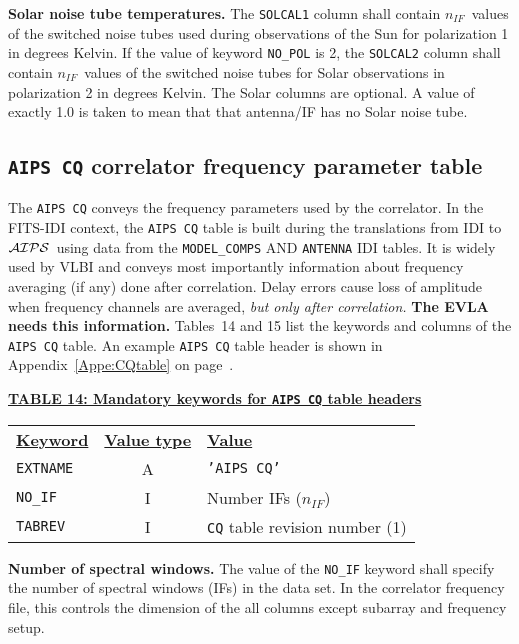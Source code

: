 \documentclass[twoside]{article}
\newcommand{\Hi}[1]{\textcolor{hicol}{#1}}
\newcommand{\AIPS}{{$\cal AIPS\/$}}
\newcommand{\nif}{$n_{IF}$}
\begin{document}
\Hi{{\bf Solar noise tube temperatures.} The {\tt SOLCAL1} column
shall contain \nif\ values of the switched noise tubes used during
observations of the Sun for polarization 1 in degrees Kelvin.  If the
value of keyword {\tt NO\_POL} is 2, the {\tt SOLCAL2} column shall
contain \nif\ values of the switched noise tubes for Solar
observations in polarization 2 in degrees Kelvin.  The Solar columns
are optional.  A value of exactly 1.0 is taken to mean that that
antenna/IF has no Solar noise tube.}

\subsection{{\tt AIPS CQ} correlator frequency parameter table}
\label{s:CQ}

The {\tt AIPS CQ} conveys the frequency parameters used by the
correlator.  In the FITS-IDI context, the {\tt AIPS CQ} table
is built during the translations from IDI to \AIPS\ using data from
the {\tt MODEL\_COMPS} AND {\tt ANTENNA} IDI tables.  It is widely
used by VLBI and conveys most importantly information about frequency
averaging (if any) done after correlation.  Delay errors cause loss of
amplitude when frequency channels are averaged, {\it but only after
  correlation.}  {\bf The EVLA needs this information.}  Tables~14 and
15 list the keywords and columns of the {\tt AIPS CQ} table.  An
example {\tt AIPS CQ} table header is shown in
Appendix~\ref{Appe:CQtable} on page~\pageref{Appe:CQtable}.

\begin{center}
\underline{\bf{TABLE 14: Mandatory keywords for {\tt AIPS CQ} table
    headers}}\\
\begin{tabular}{lcl}
\noalign{\vspace{2pt}} \label{ta:CQkeys}
\underline{{\bf Keyword}} & \underline{\bf{Value type}} &
    \underline{\bf{Value\vphantom{y}}} \\
\noalign{\vspace{2pt}}
{\tt EXTNAME}   & A & {\tt 'AIPS CQ'}  \\
{\tt NO\_IF}    & I & Number IFs (\nif) \\
{\tt TABREV}    & I & {\tt CQ} table revision number (1)
\end{tabular}
\end{center}

{\bf Number of spectral windows.} The value of the {\tt NO\_IF}
keyword shall specify the number of spectral windows (IFs) in the data
set.  In the correlator frequency file, this controls the dimension of
the all columns except subarray and frequency setup.
\end{document}
